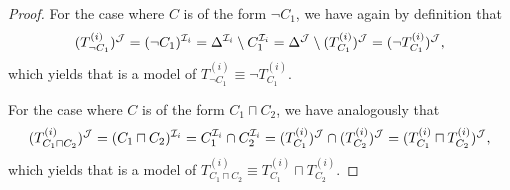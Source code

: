 \begin{proof}
    For the case where $C$ is of the form $\lnot C_1$, we have again by
    definition that
    \[(T_{\lnot C_1}^{(i)})^\Jmc%
        =(\lnot C_1)^{\Imc_i}%
        =\Delta^{\Imc_i}\setminus C_1^{\Imc_i}%
        =\Delta^\Jmc\setminus(T_{C_1}^{(i)})^\Jmc%
        =(\lnot T_{C_1}^{(i)})^\Jmc,\]
    which yields that \Jmc is a model of $T_{\lnot C_1}^{(i)}\equiv\lnot
    T_{C_1}^{(i)}$.

    For the case where $C$ is of the form $C_1\sqcap C_2$, we have analogously
    that
    \[(T_{C_1\sqcap C_2}^{(i)})^\Jmc%
        =(C_1\sqcap C_2)^{\Imc_i}%
        =C_1^{\Imc_i}\cap C_2^{\Imc_i}=(T_{C_1}^{(i)})^\Jmc\cap(T_{C_2}^{(i)})^\Jmc%
        =(T_{C_1}^{(i)}\sqcap T_{C_2}^{(i)})^\Jmc,\]
    which yields that \Jmc is a model of $T_{C_1\sqcap C_2}^{(i)}\equiv
    T_{C_1}^{(i)}\sqcap T_{C_2}^{(i)}$.


\end{proof}

